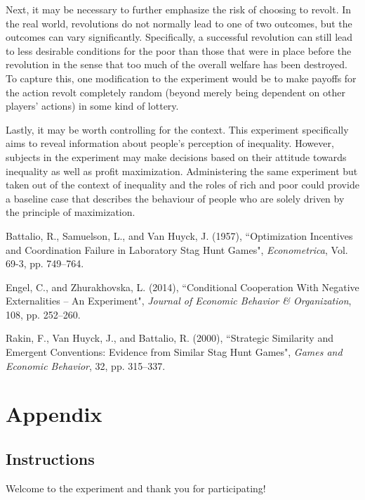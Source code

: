 \documentclass[12pt]{article}
\begin{document}
	Next, it may be necessary to further emphasize the risk of choosing to 
	revolt. In the real world, revolutions do not normally lead to one of two 
	outcomes, but the outcomes can vary significantly. Specifically, a 
	successful revolution can still lead to less desirable conditions for the 
	poor than those that were in place before the revolution in the sense that 
	too much of the overall welfare has been destroyed. To capture this, one 
	modification to the experiment would be to make payoffs for the action 
	revolt completely random (beyond merely being dependent on other players' 
	actions) in some kind of lottery.
	
	Lastly, it may be worth controlling for the context. This experiment 
	specifically aims to reveal information about people's perception of 
	inequality. However, subjects in the experiment may make decisions based on 
	their attitude towards inequality as well as profit maximization. 
	Administering the same experiment but taken out of the context of 
	inequality 
	and the roles of rich and poor could provide a baseline case that describes 
	the behaviour of people who are solely driven by the principle of 
	maximization.
	
	\begin{thebibliography}{99}
		Battalio, R., Samuelson, L., and Van Huyck, J. (1957), ``Optimization 
		Incentives and Coordination Failure in Laboratory Stag Hunt Games",
		\textit{Econometrica}, Vol. 69-3, pp. 749--764.
		
		Engel, C., and Zhurakhovska, L. (2014), ``Conditional Cooperation
		With Negative Externalities -- An Experiment", \emph{Journal of 
		Economic Behavior \& Organization}, 108, pp. 252--260.
		
		Rakin, F., Van Huyck, J., and Battalio, R. (2000), ``Strategic 
		Similarity and Emergent Conventions: Evidence from Similar Stag Hunt 
		Games", \emph{Games and Economic Behavior}, 32, pp. 315--337.
	\end{thebibliography}
	
	\newpage
	\section*{Appendix}
	\subsection*{Instructions}
	Welcome to the experiment and thank you for participating!
	
\end{document}

